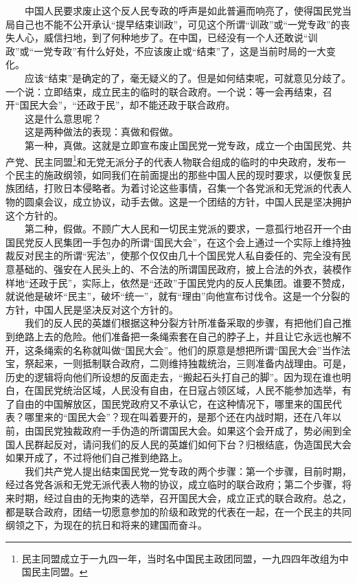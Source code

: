 \documentclass[cn,11pt,chinese]{elegantbook}
\begin{document}
　　中国人民要求废止这个反人民专政的呼声是如此普遍而响亮了，使得国民党当局自己也不能不公开承认“提早结束训政”，可见这个所谓“训政”或“一党专政”的丧失人心，威信扫地，到了何种地步了。在中国，已经没有一个人还敢说“训政”或“一党专政”有什么好处，不应该废止或“结束”了，这是当前时局的一大变化。\\
　　应该“结束”是确定的了，毫无疑义的了。但是如何结束呢，可就意见分歧了。一个说：立即结束，成立民主的临时的联合政府。一个说：等一会再结束，召开“国民大会”，“还政于民”，却不能还政于联合政府。\\
　　这是什么意思呢？\\
　　这是两种做法的表现：真做和假做。\\
　　第一种，真做。这就是立即宣布废止国民党一党专政，成立一个由国民党、共产党、民主同盟\footnote[16]{  民主同盟成立于一九四一年，当时名中国民主政团同盟，一九四四年改组为中国民主同盟。}和无党无派分子的代表人物联合组成的临时的中央政府，发布一个民主的施政纲领，如同我们在前面提出的那些中国人民的现时要求，以便恢复民族团结，打败日本侵略者。为着讨论这些事情，召集一个各党派和无党派的代表人物的圆桌会议，成立协议，动手去做。这是一个团结的方针，中国人民是坚决拥护这个方针的。\\
　　第二种，假做。不顾广大人民和一切民主党派的要求，一意孤行地召开一个由国民党反人民集团一手包办的所谓“国民大会”，在这个会上通过一个实际上维持独裁反对民主的所谓“宪法”，使那个仅仅由几十个国民党人私自委任的、完全没有民意基础的、强安在人民头上的、不合法的所谓国民政府，披上合法的外衣，装模作样地“还政于民”，实际上，依然是“还政”于国民党内的反人民集团。谁要不赞成，就说他是破坏“民主”，破坏“统一”，就有“理由”向他宣布讨伐令。这是一个分裂的方针，中国人民是坚决反对这个方针的。\\
　　我们的反人民的英雄们根据这种分裂方针所准备采取的步骤，有把他们自己推到绝路上去的危险。他们准备把一条绳索套在自己的脖子上，并且让它永远也解不开，这条绳索的名称就叫做“国民大会”。他们的原意是想把所谓“国民大会”当作法宝，祭起来，一则抵制联合政府，二则维持独裁统治，三则准备内战理由。可是，历史的逻辑将向他们所设想的反面走去，“搬起石头打自己的脚”。因为现在谁也明白，在国民党统治区域，人民没有自由，在日寇占领区域，人民不能参加选举，有了自由的中国解放区，国民党政府又不承认它，在这种情况下，哪里来的国民代表？哪里来的“国民大会”？现在叫着要开的，是那个还在内战时期，还在八年以前，由国民党独裁政府一手伪造的所谓国民大会。如果这个会开成了，势必闹到全国人民群起反对，请问我们的反人民的英雄们如何下台？归根结底，伪造国民大会如果开成了，不过将他们自己推到绝路上。\\
　　我们共产党人提出结束国民党一党专政的两个步骤：第一个步骤，目前时期，经过各党各派和无党无派代表人物的协议，成立临时的联合政府；第二个步骤，将来时期，经过自由的无拘束的选举，召开国民大会，成立正式的联合政府。总之，都是联合政府，团结一切愿意参加的阶级和政党的代表在一起，在一个民主的共同纲领之下，为现在的抗日和将来的建国而奋斗。\\
\end{document}
